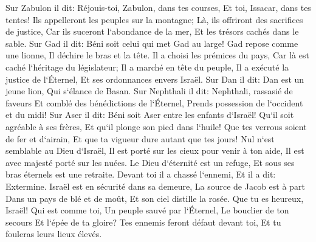 \verse Sur Zabulon il dit: Réjouis-toi, Zabulon, dans tes courses, Et toi, Issacar, dans tes tentes! 
\verse Ils appelleront les peuples sur la montagne; Là, ils offriront des sacrifices de justice, Car ils suceront l`abondance de la mer, Et les trésors cachés dans le sable. 
\verse Sur Gad il dit: Béni soit celui qui met Gad au large! Gad repose comme une lionne, Il déchire le bras et la tête. 
\verse Il a choisi les prémices du pays, Car là est caché l`héritage du législateur; Il a marché en tête du peuple, Il a exécuté la justice de l`Éternel, Et ses ordonnances envers Israël. 
\verse Sur Dan il dit: Dan est un jeune lion, Qui s`élance de Basan. 
\verse Sur Nephthali il dit: Nephthali, rassasié de faveurs Et comblé des bénédictions de l`Éternel, Prends possession de l`occident et du midi! 
\verse Sur Aser il dit: Béni soit Aser entre les enfants d`Israël! Qu`il soit agréable à ses frères, Et qu`il plonge son pied dans l`huile! 
\verse Que tes verrous soient de fer et d`airain, Et que ta vigueur dure autant que tes jours! 
\verse Nul n`est semblable au Dieu d`Israël, Il est porté sur les cieux pour venir à ton aide, Il est avec majesté porté sur les nuées. 
\verse Le Dieu d`éternité est un refuge, Et sous ses bras éternels est une retraite. Devant toi il a chassé l`ennemi, Et il a dit: Extermine. 
\verse Israël est en sécurité dans sa demeure, La source de Jacob est à part Dans un pays de blé et de moût, Et son ciel distille la rosée. 
\verse Que tu es heureux, Israël! Qui est comme toi, Un peuple sauvé par l`Éternel, Le bouclier de ton secours Et l`épée de ta gloire? Tes ennemis feront défaut devant toi, Et tu fouleras leurs lieux élevés. 

